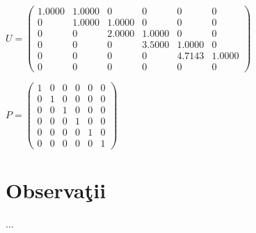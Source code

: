 \documentclass{article}
\begin{document}
\begin{center}
$
U =\begin{pmatrix}
  1.0000 &   1.0000 &        0 &        0 &        0 &        0 \\
       0 &   1.0000 &   1.0000 &        0 &        0 &        0 \\
       0 &        0 &   2.0000 &   1.0000 &        0 &        0 \\
       0 &        0 &        0 &   3.5000 &   1.0000 &        0 \\
       0 &        0 &        0 &        0 &   4.7143 &   1.0000 \\
       0 &        0 &        0 &        0 &        0 &        0
\end{pmatrix}
$
\end{center} 

\begin{center}
$
P =\begin{pmatrix}
  1 &    0 &    0 &    0 &    0 &    0 \\
  0 &    1 &    0 &    0 &    0 &    0 \\
  0 &    0 &    1 &    0 &    0 &    0 \\
  0 &    0 &    0 &    1 &    0 &    0 \\
  0 &    0 &    0 &    0 &    1 &    0 \\
  0 &    0 &    0 &    0 &    0 &    1
\end{pmatrix}
$
\end{center}
    
\section*{Observa\c{t}ii}

...
\end{document}
